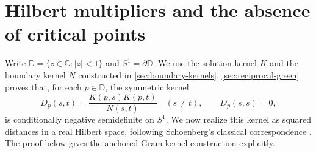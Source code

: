 \section{Hilbert multipliers and the absence of critical points}\label{sec:hilbert-multipliers}

Write $\mathbb D=\{z\in\mathbb C:|z|<1\}$ and
$S^1=\partial\mathbb D$. We use the solution kernel $K$ and the
boundary kernel $N$ constructed in \cref{sec:boundary-kernels}. \cref{sec:reciprocal-green} proves that,
for each $p\in\mathbb D$, the symmetric kernel
\[
 D_p(s,t)=\frac{K(p,s)K(p,t)}{N(s,t)}\quad(s\ne t),
 \qquad D_p(s,s)=0,
\]
is conditionally negative semidefinite on $S^1$. We now realize this
kernel as squared distances in a real Hilbert space, following
Schoenberg's classical correspondence \cite{Sch38}. The proof below
gives the anchored Gram-kernel construction explicitly.

